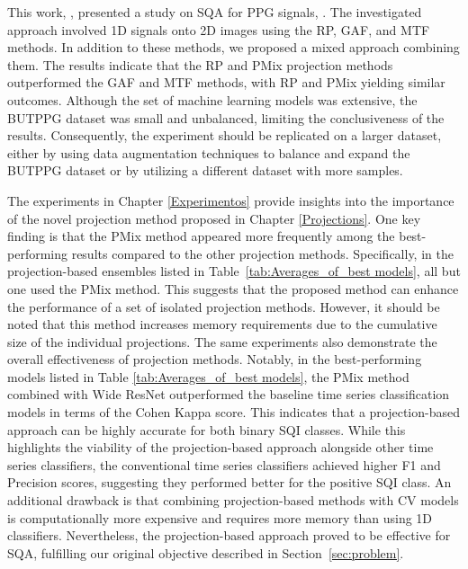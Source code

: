 This work, , presented a study on \gls{SQA} for \gls{PPG} signals, . The investigated  approach involved  {1D} signals onto {2D} images using the \acrshort{RP}, \acrshort{GAF}, and \acrshort{MTF} methods. In addition to these methods, we proposed a mixed approach combining them. The results indicate that the \acrshort{RP} and \gls{PMix} projection methods outperformed the \acrshort{GAF} and \acrshort{MTF} methods, with \acrshort{RP} and \gls{PMix} yielding similar outcomes. Although the set of machine learning models was extensive, the \gls{BUTPPG} dataset was small and unbalanced, limiting the conclusiveness of the results. Consequently, the experiment should be replicated on a larger dataset, either by using data augmentation techniques to balance and expand the BUTPPG dataset or by utilizing a different dataset with more samples. 

The experiments in Chapter \ref{Experimentos} provide insights into the importance of the novel projection method proposed in Chapter \ref{Projections}. One key finding is that the \gls{PMix} method appeared more frequently among the best-performing results compared to the other projection methods. Specifically, in the projection-based ensembles listed in Table~\ref{tab:Averages_of_best models}, all but one used the \gls{PMix} method. This suggests that the proposed method can enhance the performance of a set of isolated projection methods. However, it should be noted that this method increases memory requirements due to the cumulative size of the individual projections. The same experiments also demonstrate the overall effectiveness of projection methods. Notably, in the best-performing models listed in Table \ref{tab:Averages_of_best models}, the \gls{PMix} method combined with Wide ResNet outperformed the baseline time series classification models in terms of the Cohen Kappa score. This indicates that a projection-based approach can be highly accurate for both binary \gls{SQI} classes. While this highlights the viability of the projection-based approach alongside other time series classifiers, the conventional time series classifiers achieved higher F1 and Precision scores, suggesting they performed better for the positive \gls{SQI} class. An additional drawback is that combining projection-based methods with \gls{CV} models is computationally more expensive and requires more memory than using 1D classifiers. Nevertheless, the projection-based approach proved to be effective for \gls{SQA}, fulfilling our original objective described in Section~\ref{sec:problem}.


